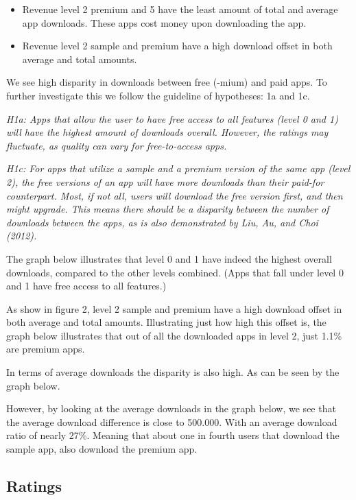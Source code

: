 \documentclass[
  12pt,
  a4paper,
]{article}
\begin{document}
\begin{itemize}
\item
  Revenue level 2 premium and 5 have the least amount of total and
  average app downloads. These apps cost money upon downloading the app.
\item
  Revenue level 2 sample and premium have a high download offset in both
  average and total amounts.
\end{itemize}

We see high disparity in downloads between free (-mium) and paid apps.
To further investigate this we follow the guideline of hypotheses: 1a
and 1c.

\emph{H1a: Apps that allow the user to have free access to all features
(level 0 and 1) will have the highest amount of downloads overall.
However, the ratings may fluctuate, as quality can vary for
free-to-access apps.}

\emph{H1c: For apps that utilize a sample and a premium version of the
same app (level 2), the free versions of an app will have more downloads
than their paid-for counterpart. Most, if not all, users will download
the free version first, and then might upgrade. This means there should
be a disparity between the number of downloads between the apps, as is
also demonstrated by Liu, Au, and Choi (2012).}

The graph below illustrates that level 0 and 1 have indeed the highest
overall downloads, compared to the other levels combined. (Apps that
fall under level 0 and 1 have free access to all features.)

As show in figure 2, level 2 sample and premium have a high download
offset in both average and total amounts. Illustrating just how high
this offset is, the graph below illustrates that out of all the
downloaded apps in level 2, just 1.1\% are premium apps.

In terms of average downloads the disparity is also high. As can be seen
by the graph below.

However, by looking at the average downloads in the graph below, we see
that the average download difference is close to 500.000. With an
average download ratio of nearly 27\%. Meaning that about one in fourth
users that download the sample app, also download the premium app.

\subsection{Ratings}\label{ratings}
\end{document}
